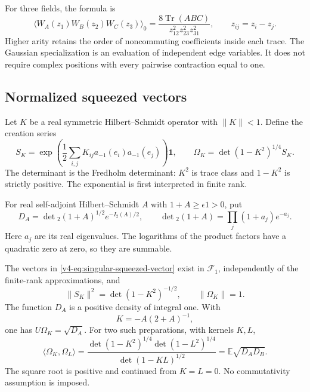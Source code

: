 For three fields, the formula is
\[
 \langle W_A(z_1)W_B(z_2)W_C(z_3)\rangle_0
     =\frac{8\operatorname{Tr}(ABC)}
             {z_{12}^2z_{23}^2z_{31}^2},
 \qquad z_{ij}=z_i-z_j.
\]
Higher arity retains the order of noncommuting
coefficients inside each trace. The Gaussian
specialization is an evaluation of independent
edge variables. It does not require complex
positions with every pairwise contraction equal
to one.

\subsection{Normalized squeezed vectors}

Let \(K\) be a real symmetric Hilbert--Schmidt
operator with \(\|K\|<1\). Define the creation
series
\begin{equation}\label{v4-eq:singular-squeezed-vector}
 S_K=\exp\left(\frac12\sum_{i,j}K_{ij}
                a_{-1}(e_i)a_{-1}(e_j)\right)\mathbf1,
 \qquad
 \Omega_K=\det(1-K^2)^{1/4}S_K.
\end{equation}
The determinant is the Fredholm determinant:
\(K^2\) is trace class and \(1-K^2\) is
strictly positive. The exponential is first
interpreted in finite rank.

For real self-adjoint Hilbert--Schmidt \(A\)
with \(1+A\geq\epsilon1>0\), put
\begin{equation}\label{v4-eq:singular-gaussian-density}
 D_A=\det{}_2(1+A)^{1/2}e^{-I_2(A)/2},
 \qquad
 \det{}_2(1+A)=\prod_j(1+a_j)e^{-a_j}.
\end{equation}
Here \(a_j\) are its real eigenvalues.
The logarithms of the product factors have
a quadratic zero at zero, so they are summable.

\begin{theorem}\label{v4-thm:singular-squeezed-preparation}
The vectors in \eqref{v4-eq:singular-squeezed-vector}
exist in \(\mathcal F_1\), independently of the
finite-rank approximations, and
\[
       \|S_K\|^2=\det(1-K^2)^{-1/2},
       \qquad \|\Omega_K\|=1.
\]
The function \(D_A\) is a positive density
of integral one. With
\[
                         K=-A(2+A)^{-1},
\]
one has \(U\Omega_K=\sqrt{D_A}\).
For two such preparations, with kernels \(K,L\),
\begin{equation}\label{v4-eq:singular-squeezed-overlap}
 \langle\Omega_K,\Omega_L\rangle
   =\frac{\det(1-K^2)^{1/4}\det(1-L^2)^{1/4}}
           {\det(1-KL)^{1/2}}
   =\mathbb E\sqrt{D_AD_B}.
\end{equation}
The square root is positive and continued from
\(K=L=0\). No commutativity assumption is imposed.
\end{theorem}

